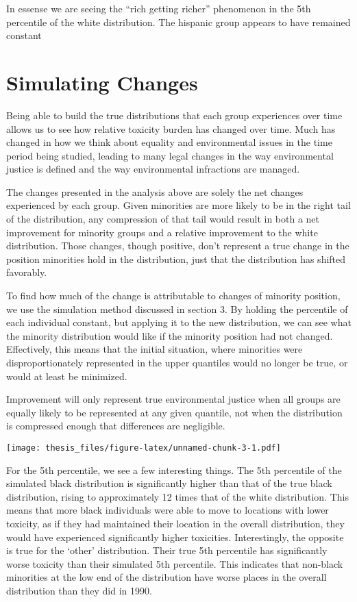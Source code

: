 \documentclass[12pt,twoside]{dukestatscithesis}
\theoremstyle{definition}
\theoremstyle{definition}
\theoremstyle{definition}
\theoremstyle{remark}
\begin{document}
In essense we are seeing the ``rich getting richer'' phenomenon in the
5th percentile of the white distribution. The hispanic group appears to
have remained constant

\section{Simulating Changes}\label{simulating-changes}

Being able to build the true distributions that each group experiences
over time allows us to see how relative toxicity burden has changed over
time. Much has changed in how we think about equality and environmental
issues in the time period being studied, leading to many legal changes
in the way environmental justice is defined and the way environmental
infractions are managed.

The changes presented in the analysis above are solely the net changes
experienced by each group. Given minorities are more likely to be in the
right tail of the distribution, any compression of that tail would
result in both a net improvement for minority groups and a relative
improvement to the white distribution. Those changes, though positive,
don't represent a true change in the position minorities hold in the
distribution, just that the distribution has shifted favorably.

To find how much of the change is attributable to changes of minority
position, we use the simulation method discussed in section 3. By
holding the percentile of each individual constant, but applying it to
the new distribution, we can see what the minority distribution would
like if the minority position had not changed. Effectively, this means
that the initial situation, where minorities were disproportionately
represented in the upper quantiles would no longer be true, or would at
least be minimized.

Improvement will only represent true environmental justice when all
groups are equally likely to be represented at any given quantile, not
when the distribution is compressed enough that differences are
negligible.

\texttt{[image: thesis\_files/figure-latex/unnamed-chunk-3-1.pdf]}

For the 5th percentile, we see a few interesting things. The 5th
percentile of the simulated black distribution is significantly higher
than that of the true black distribution, rising to approximately 12
times that of the white distribution. This means that more black
individuals were able to move to locations with lower toxicity, as if
they had maintained their location in the overall distribution, they
would have experienced significantly higher toxicities. Interestingly,
the opposite is true for the `other' distribution. Their true 5th
percentile has significantly worse toxicity than their simulated 5th
percentile. This indicates that non-black minorities at the low end of
the distribution have worse places in the overall distribution than they
did in 1990.
\end{document}
